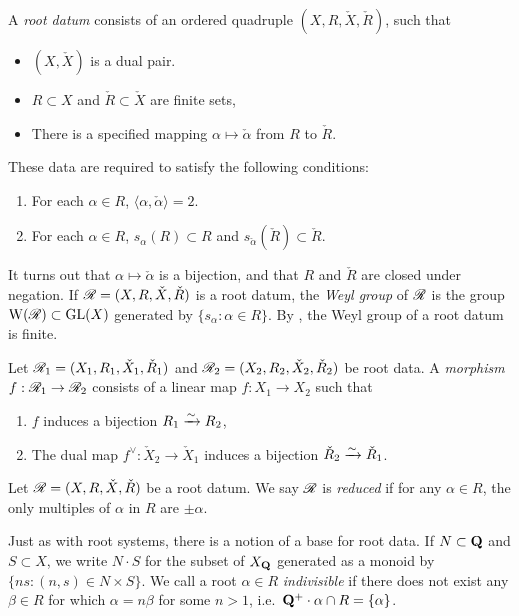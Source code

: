 \begin{definition}
A \emph{root datum} consists of an ordered quadruple $(X,R,\check X,\check R)$, 
such that 
\begin{itemize}
  \item $(X,\check X)$ is a dual pair. 
  \item $R\subset X$ and $\check R\subset \check X$ are finite sets, 
  \item There is a specified mapping $\alpha\mapsto \check\alpha$ from $R$ to 
    $\check R$. 
\end{itemize}
These data are required to satisfy the following conditions:
\begin{enumerate}
  \item For each $\alpha\in R$, $\langle\alpha,\check\alpha\rangle=2$. 
  \item For each $\alpha\in R$, $s_\alpha(R)\subset R$ and 
    $s_{\check\alpha}(\check R)\subset \check R$. 
\end{enumerate}
\end{definition}

It turns out that $\alpha\mapsto \check\alpha$ is a bijection, and that 
$R$ and $\check R$ are closed under negation. If $\mathscr{R}=(X,R,\check X,\check R)$ 
is a root datum, the \emph{Weyl group} of $\mathscr{R}$ is the group  
$\operatorname{W}(\mathscr{R})\subset \operatorname{GL}(X)$ generated by $\{s_\alpha:\alpha\in R\}$. By 
\cite[XXI 1.2.8]{sga3-iii}, the Weyl group of a root datum is finite. 

\begin{definition}
Let $\mathscr{R}_1=(X_1,R_1,\check X_1,\check R_1)$ and 
$\mathscr{R}_2=(X_2,R_2,\check X_2,\check R_2)$ be root data. A \emph{morphism} 
$f:\mathscr{R}_1\to \mathscr{R}_2$ consists of a linear map $f:X_1\to X_2$ such that 
\begin{enumerate}
  \item $f$ induces a bijection $R_1\xrightarrow\sim R_2$, 
  \item The dual map $f^\vee:\check X_2\to \check X_1$ induces a bijection 
    $\check R_2\xrightarrow\sim \check R_1$. 
\end{enumerate}
\end{definition}

\begin{definition}
Let $\mathscr{R}=(X,R,\check X,\check R)$ be a root datum. We say $\mathscr{R}$ is 
\emph{reduced} if for any $\alpha\in R$, the only multiples of $\alpha$ in 
$R$ are $\pm \alpha$. 
\end{definition}

Just as with root systems, there is a notion of a base for root data. If 
$N\subset \mathbf{Q}$ and $S\subset X$, we write $N\cdot S$ for the subset of 
$X_{\mathbf{Q}}$ generated as a monoid by $\{n s:(n,s)\in N\times S\}$. We 
call a root $\alpha\in R$ \emph{indivisible} if there does not exist any 
$\beta\in R$ for which $\alpha= n \beta$ for some $n>1$, 
i.e.~$\mathbf{Q}^+\cdot\alpha\cap R=\{\alpha\}$.

